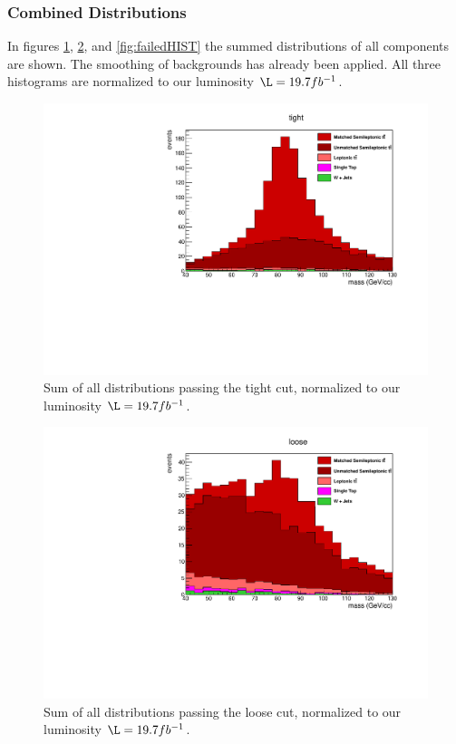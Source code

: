\subsubsection{Combined Distributions}
In figures \ref{fig:tightHIST}, \ref{fig:looseHIST}, and \ref{fig:failedHIST} the summed distributions of all components are shown. The smoothing of backgrounds has already been applied. All three histograms are normalized to our luminosity $\L = 19.7 fb^{-1}$.
\begin{figure}[ht!]
\centering
\includegraphics[scale=0.66]{figs/WtagSF/TOTAL_TIGHT.pdf}
\caption{Sum of all distributions passing the tight cut, normalized to our luminosity $\L = 19.7 fb^{-1}$.}\label{fig:tightHIST}
\end{figure}
\begin{figure}[ht!]
\centering
\includegraphics[scale=0.66]{figs/WtagSF/TOTAL_LOOSE.pdf}
\caption{Sum of all distributions passing the loose cut, normalized to our luminosity $\L = 19.7 fb^{-1}$.}\label{fig:looseHIST}
\end{figure}
